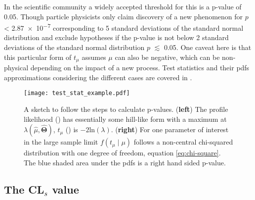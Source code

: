 In the scientific community a widely accepted threshold for this is a p-value of 0.05. Though particle physicists only claim discovery of a new phenomenon for $p$ < \qty{2.87e-7}{} corresponding to 5 standard deviations of the standard normal distribution and exclude hypotheses if the p-value is not below 2 standard deviations of the standard normal distribution $p$ $\lesssim$ \qty{0.05}{}. One caveat here is that this particular form of $t_\mu$ assumes $\mu$ can also be negative, which can be non-physical depending on the impact of a new process. Test statistics and their \acp{pdf} approximations considering the different cases are covered in \citep{cowan2011asymptotic}. 
\begin{figure}
    \centering
    \texttt{[image: test\_stat\_example.pdf]}
        \caption[]{A sketch to follow the steps to calculate p-values. (\textbf{left}) The profile likelihood () has essentially some hill-like form with a maximum at ${\lambda(\hat{\mu},\hat{\bm{\Theta}})}$, $t_\mu$ () is $-2\mathrm{ln}(\lambda)$. (\textbf{right}) For one parameter of interest in the large sample limit $f(t_\mu \mid \mu)$ follows a non-central chi-squared distribution with one degree of freedom, equation \ref{eq:chi-square}. The blue shaded area under the \acp{pdf} is a right hand sided p-value.}
    \label{fig:test_stat_example}    
\end{figure}

\subsection{The CL$_s$ value}\label{sec:cls}


